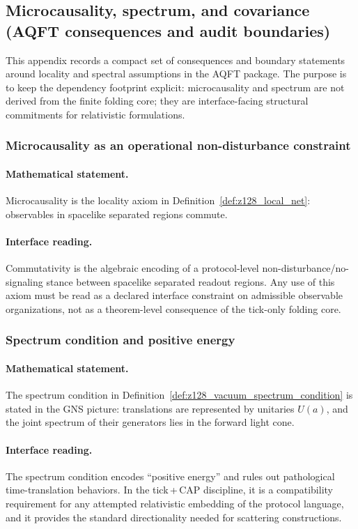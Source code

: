 \subsection{Microcausality, spectrum, and covariance (AQFT consequences and audit boundaries)}
\label{app:microcausality_spectrum_covariance}

This appendix records a compact set of consequences and boundary statements around locality and spectral assumptions in the AQFT package.
The purpose is to keep the dependency footprint explicit: microcausality and spectrum are not derived from the finite folding core; they are interface-facing structural commitments for relativistic formulations.

\subsubsection{Microcausality as an operational non-disturbance constraint}
\paragraph{Mathematical statement.}
Microcausality is the locality axiom in Definition~\ref{def:z128_local_net}: observables in spacelike separated regions commute.

\paragraph{Interface reading.}
\InterfaceTag Commutativity is the algebraic encoding of a protocol-level non-disturbance/no-signaling stance between spacelike separated readout regions.
Any use of this axiom must be read as a declared interface constraint on admissible observable organizations, not as a theorem-level consequence of the tick-only folding core.

\subsubsection{Spectrum condition and positive energy}
\paragraph{Mathematical statement.}
The spectrum condition in Definition~\ref{def:z128_vacuum_spectrum_condition} is stated in the GNS picture: translations are represented by unitaries $U(a)$, and the joint spectrum of their generators lies in the forward light cone.

\paragraph{Interface reading.}
\InterfaceTag The spectrum condition encodes ``positive energy'' and rules out pathological time-translation behaviors.
In the tick\,+\,CAP discipline, it is a compatibility requirement for any attempted relativistic embedding of the protocol language, and it provides the standard directionality needed for scattering constructions.

